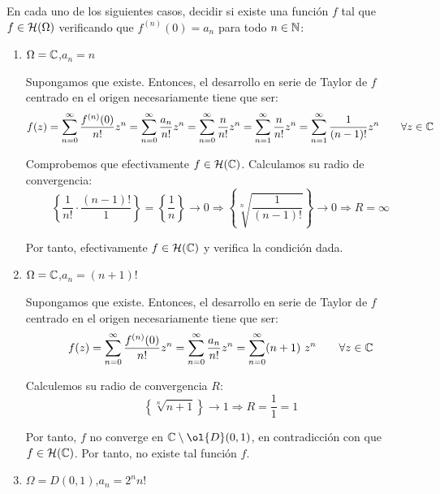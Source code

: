 \begin{ejercicio}
    En cada uno de los siguientes casos, decidir si existe una función $f$ tal que $f \in \mathcal{H}(\Omega)$ verificando que $f^{(n)}(0) = a_n$ para todo $n \in \mathbb{N}$:
    \begin{enumerate}
        \item $\Omega = \mathbb{C}$,\qquad $a_n = n$
        
        Supongamos que existe. Entonces, el desarrollo en serie de Taylor de $f$ centrado en el origen necesariamente tiene que ser:
        \begin{equation*}
            f(z) = \sum_{n=0}^{\infty} \dfrac{f^{(n)}(0)}{n!}z^n = \sum_{n=0}^{\infty} \dfrac{a_n}{n!}z^n = \sum_{n=0}^{\infty} \dfrac{n}{n!}z^n =\sum_{n=1}^{\infty} \dfrac{n}{n!}z^n =
            \sum_{n=1}^{\infty} \dfrac{1}{(n-1)!}z^n\qquad \forall z \in \mathbb{C}
        \end{equation*}

        Comprobemos que efectivamente $f\in \mathcal{H}(\mathbb{C})$. Calculamos su radio de convergencia:
        \begin{equation*}
            \left\{\dfrac{1}{n!}\cdot \dfrac{(n-1)!}{1}\right\}=\left\{\dfrac{1}{n}\right\} \to 0 \Longrightarrow \left\{\sqrt[n]{\dfrac{1}{(n-1)!}}\right\} \to 0 \Longrightarrow R=\infty
        \end{equation*}

        Por tanto, efectivamente $f\in \mathcal{H}(\mathbb{C})$ y verifica la condición dada.
        \item $\Omega = \mathbb{C}$,\qquad $a_n = (n+1)!$
        
        Supongamos que existe. Entonces, el desarrollo en serie de Taylor de $f$ centrado en el origen necesariamente tiene que ser:
        \begin{equation*}
            f(z) = \sum_{n=0}^{\infty} \dfrac{f^{(n)}(0)}{n!}z^n = \sum_{n=0}^{\infty} \dfrac{a_n}{n!}z^n = \sum_{n=0}^{\infty} (n+1)\ z^n\qquad 
            \forall z \in \mathbb{C}
        \end{equation*}

        Calculemos su radio de convergencia $R$:
        \begin{equation*}
            \left\{\sqrt[n]{n+1}\right\}\to 1\Longrightarrow R=\frac{1}{1} = 1
        \end{equation*}

        Por tanto, $f$ no converge en $\bb{C}\setminus \ol{D}(0,1)$, en contradicción con que $f\in \mathcal{H}(\mathbb{C})$. Por tanto, no existe tal función $f$.
        \item $\Omega = D(0,1)$,\qquad $a_n = 2^n n!$
        

\end{enumerate}
\end{ejercicio}
